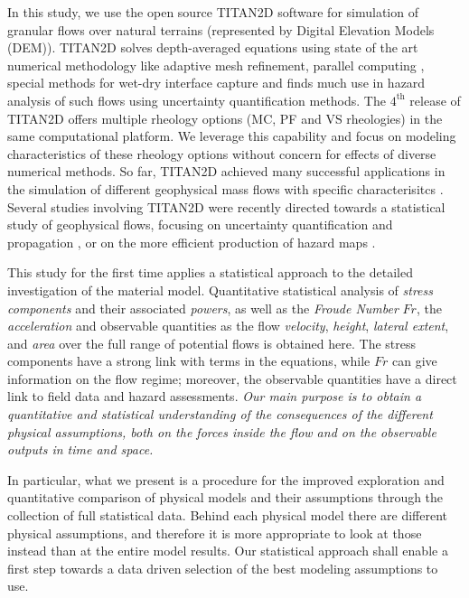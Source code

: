 \documentclass{article}
\begin{document}
In this study, we use the open source TITAN2D software for simulation of granular flows over natural terrains (represented by Digital Elevation Models (DEM)).  TITAN2D solves depth-averaged equations using
state of the art numerical methodology like adaptive mesh refinement, parallel computing  \citep{Pitman2003a, Patra2005, Patra2006, Yu2009}, special methods for wet-dry interface capture \citep{Aghakhani2016} and finds much use in hazard analysis of such flows using uncertainty quantification methods. The $\mathrm{4^{\mathrm{th}}}$ release of TITAN2D offers multiple rheology options (MC, PF and VS rheologies)  in the same computational platform. We leverage this capability and focus on modeling characteristics of these rheology options without concern for effects of diverse numerical methods. So far, TITAN2D achieved many successful applications in the simulation of different geophysical mass flows with specific characterisitcs \citep{Sheridan2005, Rupp2006, Norini2008, Charbonnier2009, Procter2010, Sheridan2010, Sulpizio2010, Capra2011}. Several studies involving TITAN2D were recently directed towards a statistical study of geophysical flows, focusing on uncertainty quantification and propagation \citep{Dalbey2008, Dalbey2009, Stefanescu2012b, Stefanescu2012a}, or on the more efficient production of hazard maps \citep{Bayarri2009, Spiller2014,Bayarri2015, Ogburn2016}.

This study for the first time applies a statistical approach to the detailed investigation of the material model. Quantitative statistical analysis of  \emph{stress components} and their associated \emph{powers}, as well as the \emph{Froude Number} $Fr$, the \emph{acceleration} and observable quantities as the flow \emph{velocity}, \emph{height}, \emph{lateral extent}, and \emph{area} over the full range of potential flows is obtained here. The stress components have a strong link with  terms in the equations, while $Fr$ can give information on the flow regime; moreover, the observable quantities have a direct link to field data and hazard assessments. {\it Our main purpose is to obtain a quantitative and statistical understanding of the consequences of the different physical assumptions, both on the forces inside the flow and on the observable outputs in time and space.}

In particular, what we present is a procedure for the improved exploration and quantitative comparison of physical models and their assumptions through the collection of full statistical data. Behind each physical model there are different physical assumptions, and therefore it is more appropriate to look at those instead than at the entire model results. Our statistical approach shall enable a first step towards a data driven selection of the best modeling assumptions to use.
\end{document}
